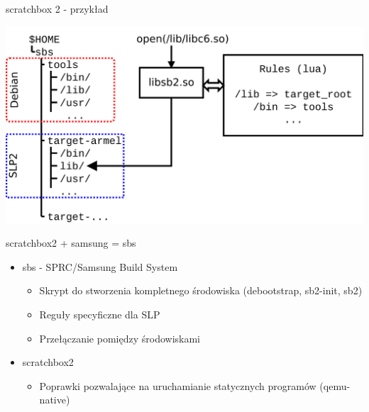 \documentclass[presentation,aspectratio=43,12pt]{beamer}
\begin{document}
\begin{frame}[label=sec-5-8]{scratchbox 2 - przykład}
\begin{center}
\includegraphics[width=\textwidth]{images/sb2-3}
\end{center}
\end{frame}
\begin{frame}[label=sec-5-9]{scratchbox2 + samsung = sbs}
\begin{itemize}
\item sbs - SPRC/Samsung Build System
\begin{itemize}
\item Skrypt do stworzenia kompletnego środowiska (debootstrap, sb2-init, sb2)
\item Reguły specyficzne dla SLP
\item Przełączanie pomiędzy środowiskami
\end{itemize}
\end{itemize}

\pause

\begin{itemize}
\item scratchbox2
\begin{itemize}
\item Poprawki pozwalające na uruchamianie statycznych programów (qemu-native)
\end{itemize}
\end{itemize}
\end{frame}
\end{document}
